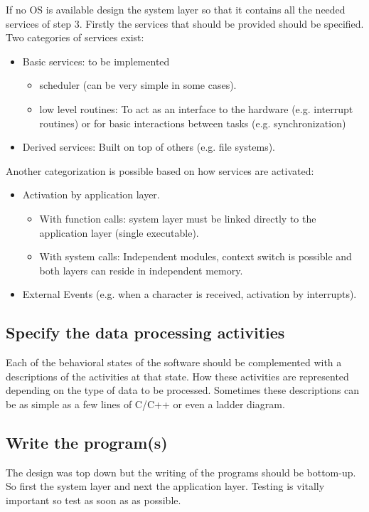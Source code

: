 If no OS is available design the  system layer so that it contains all the needed services of step 3.
Firstly the services that should be provided should be specified. 
Two categories of services exist: 
\begin{itemize}
	\item Basic services: to be implemented
	\begin{itemize}
		\item scheduler (can be very simple in some cases).
		\item low level routines: To act as an interface to the hardware (e.g. interrupt routines) or for basic interactions between tasks (e.g. synchronization)
	\end{itemize}
	
	\item Derived services: Built on top of others (e.g. file systems).
\end{itemize}

Another categorization is possible based on how services are activated: 
\begin{itemize}
	\item Activation by application layer. 
	\begin{itemize}
		\item With function calls: system layer must be linked directly to the application layer (single executable). 
		\item With system calls: Independent modules, context switch is possible and both layers can reside in independent memory.  
	\end{itemize}
	\item External Events (e.g. when a character is received, activation by interrupts). 
\end{itemize}

\subsection{Specify the data processing activities}
\label{sss:activities}
Each of the behavioral states of the software should be complemented with a descriptions of the  activities at that state.
How these activities are represented depending on the type of data to be processed.
Sometimes these descriptions can be as simple as a few lines of C/C++ or even a ladder diagram.




\subsection{Write the program(s)}
\label{sss:write}
The design was top down but the writing of the programs should be bottom-up. So first the system layer and next the application layer. 
Testing is vitally important so test as soon as as possible.

